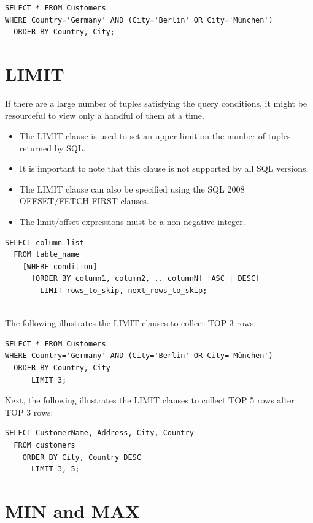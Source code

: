 \documentclass[
]{book}
\providecommand{\tightlist}{%
  \setlength{\itemsep}{0pt}\setlength{\parskip}{0pt}}
\begin{document}
\begin{verbatim}
SELECT * FROM Customers
WHERE Country='Germany' AND (City='Berlin' OR City='München')
  ORDER BY Country, City;
\end{verbatim}

\hypertarget{limit}{%
\section{LIMIT}\label{limit}}

If there are a large number of tuples satisfying the query conditions, it might be resourceful to view only a handful of them at a time.

\begin{itemize}
\tightlist
\item
  The LIMIT clause is used to set an upper limit on the number of tuples returned by SQL.
\item
  It is important to note that this clause is not supported by all SQL versions.
\item
  The LIMIT clause can also be specified using the SQL 2008 \href{https://www.geeksforgeeks.org/sql-offset-fetch-clause/}{OFFSET/FETCH FIRST} clauses.
\item
  The limit/offset expressions must be a non-negative integer.
\end{itemize}

\begin{verbatim}
SELECT column-list 
  FROM table_name 
    [WHERE condition] 
      [ORDER BY column1, column2, .. columnN] [ASC | DESC]
        LIMIT rows_to_skip, next_rows_to_skip;
          
\end{verbatim}

The following illustrates the LIMIT clauses to collect TOP 3 rows:

\begin{verbatim}
SELECT * FROM Customers
WHERE Country='Germany' AND (City='Berlin' OR City='München')
  ORDER BY Country, City
      LIMIT 3;
\end{verbatim}

Next, the following illustrates the LIMIT clauses to collect TOP 5 rows after TOP 3 rows:

\begin{verbatim}
SELECT CustomerName, Address, City, Country 
  FROM customers
    ORDER BY City, Country DESC
      LIMIT 3, 5;
\end{verbatim}

\hypertarget{min-and-max}{%
\section{MIN and MAX}\label{min-and-max}}
\end{document}
